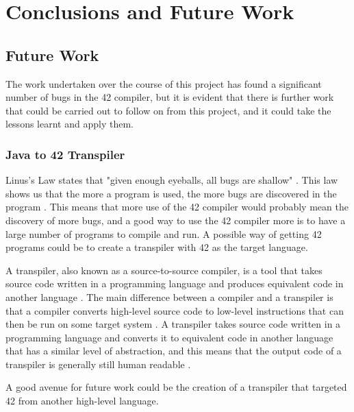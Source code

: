  \chapter{Conclusions and Future Work}\label{C:concl}
 
\section{Future Work}

The work undertaken over the course of this project has found a significant number of bugs in the 42 compiler, but it is evident that there is further work that could be carried out to follow on from this project, and it could take the lessons learnt and apply them.

 \subsection{Java to 42 Transpiler \label{trans}}

Linus's Law states that "given enough eyeballs, all bugs are shallow" \cite{cathedral}. This law shows us that the more a program is used, the more bugs are discovered in the program \cite{wang}. This means that more use of the 42 compiler would probably mean the discovery of more bugs, and a good way to use the 42 compiler more is to have a large number of programs to compile and run. A possible way of getting 42 programs could be to create a transpiler with 42 as the target language.

A transpiler, also known as a source-to-source compiler, is a tool that takes source code written in a programming language and produces equivalent code in another language \cite{scotch}. The main difference between a compiler and a transpiler is that a compiler converts high-level source code to low-level instructions that can then be run on some target system \cite{simple}. A transpiler takes source code written in a programming language and converts it to equivalent code in another language that has a similar level of abstraction, and this means that the output code of a transpiler is generally still human readable \cite{scotch}.

A good avenue for future work could be the creation of a transpiler that targeted 42 from another high-level language. 

